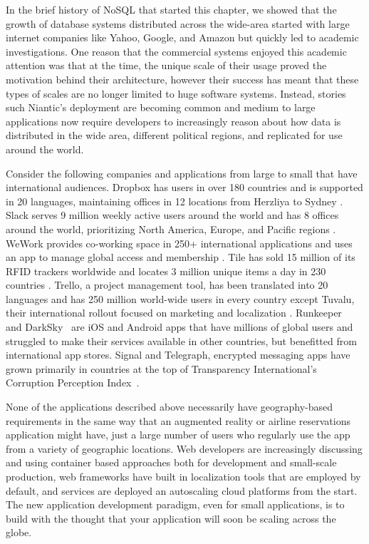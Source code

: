 In the brief history of NoSQL that started this chapter, we showed that the growth of database systems distributed across the wide-area started with large internet companies like Yahoo, Google, and Amazon but quickly led to academic investigations.
One reason that the commercial systems enjoyed this academic attention was that at the time, the unique scale of their usage proved the motivation behind their architecture, however their success has meant that these types of scales are no longer limited to huge software systems.
Instead, stories such Niantic's deployment are becoming common and medium to large applications now require developers to increasingly reason about how data is distributed in the wide area, different political regions, and replicated for use around the world.

Consider the following companies and applications from large to small that have international audiences.
Dropbox has users in over 180 countries and is supported in 20 languages, maintaining offices in 12 locations from Herzliya to Sydney \cite{dropbox}.
Slack serves 9 million weekly active users around the world and has 8 offices around the world, prioritizing North America, Europe, and Pacific regions \cite{slack}.
WeWork provides co-working space in 250+ international applications and uses an app to manage global access and membership \cite{wework_global_access}.
Tile has sold 15 million of its RFID trackers worldwide and locates 3 million unique items a day in 230 countries \cite{tile}.
Trello, a project management tool, has been translated into 20 languages and has 250 million world-wide users in every country except Tuvalu, their international rollout focused on marketing and localization \cite{trello}.
Runkeeper~\cite{runkeeper} and DarkSky~\cite{darksky} are iOS and Android apps that have millions of global users and struggled to make their services available in other countries, but benefitted from international app stores.
Signal and Telegraph, encrypted messaging apps have grown primarily in countries at the top of Transparency International's Corruption Perception Index~\cite{signal}.

None of the applications described above necessarily have geography-based requirements in the same way that an augmented reality or airline reservations application might have, just a large number of users who regularly use the app from a variety of geographic locations.
Web developers are increasingly discussing and using container based approaches both for development and small-scale production, web frameworks have built in localization tools that are employed by default, and services are deployed an autoscaling cloud platforms from the start.
The new application development paradigm, even for small applications, is to build with the thought that your application will soon be scaling across the globe.

